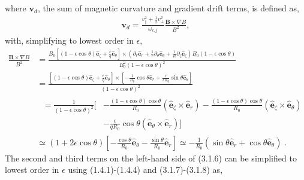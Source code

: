 \documentclass[12pt]{article}
\numberwithin{equation}{subsection}
\begin{document}
where $\bm{v}_d$, the sum of magnetic curvature and gradient drift terms, is defined as,
   \begin{equation}
   \begin{aligned}
      \bm{v}_d = \frac{v_\parallel^2 + \frac{1}{2} v_\perp^2}{\omega_{c,j}}\frac{\bm{B}\times\nabla B}{B^2},
   \end{aligned}
   \end{equation}
with, simplifying to lowest order in $\epsilon$,
   \begin{equation}
   \begin{aligned}
      \frac{\bm{B}\times\nabla B}{B^2} &= \frac{B_0[(1-\epsilon\cos\theta)\bm{\hat{e}}_\zeta + \frac{\epsilon}{q}\bm{\hat{e}}_\theta]
      \times(\partial_r\bm{\hat{e}}_r + \frac{1}{r}\partial_\theta\bm{\hat{e}}_\theta + \frac{1}{R}\partial_\zeta\bm{\hat{e}}_\zeta)
      B_0(1-\epsilon\cos\theta)}{B_0^2(1-\epsilon\cos\theta)^2} \\ &=
      \frac{[(1-\epsilon\cos\theta)\bm{\hat{e}}_\zeta + \frac{\epsilon}{q}\bm{\hat{e}}_\theta]
      \times[-\frac{1}{R_0}\cos\theta\bm{\hat{e}}_r + \frac{r}{r R_0}\sin\theta\bm{\hat{e}}_\theta]}{(1-\epsilon\cos\theta)^2} \\ &
      \begin{aligned}
         \;= \frac{1}{(1-\epsilon\cos\theta)^2}[&-\frac{(1-\epsilon\cos\theta)\cos\theta}{R_0}(\bm{\hat{e}}_\zeta\times\bm{\hat{e}}_r)
                                                 -\frac{(1-\epsilon\cos\theta)\cos\theta}{R_0}(\bm{\hat{e}}_\zeta\times\bm{\hat{e}}_\theta) \\
                                                &-\frac{\epsilon}{q R_0}\cos\theta(\bm{\hat{e}}_\theta\times\bm{\hat{e}}_r)]
      \end{aligned}         
      \\ &\simeq (1+2\epsilon\cos\theta)[-\frac{\cos\theta}{R_0}\bm{\hat{e}}_\theta-\frac{\sin\theta}{R_0}\bm{\hat{e}}_r]
          \simeq -\frac{1}{R_0}(\sin\theta\bm{\hat{e}}_r + \cos\theta\bm{\hat{e}}_\theta)\;.
   \end{aligned}
   \end{equation}
The second and third terms on the left-hand side of (3.1.6) can be simplified to lowest order in $\epsilon$ using (1.4.1)-(1.4.4) and
(3.1.7)-(3.1.8) as,
\end{document}
